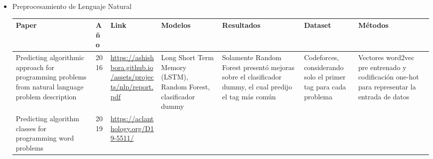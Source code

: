 \documentclass{article}
\begin{document}
\begin{itemize}
    \item Preprocesamiento de Lenguaje Natural
          
          \begin{longtable}{|p{2cm}|p{0.8cm}|p{2cm}|p{2cm}|p{3cm}|p{2cm}|p{3cm}|}
              \hline
              \textbf{Paper} & \textbf{Año}                                                                                                                                                       & \textbf{Link} & \textbf{Modelos} & \textbf{Resultados} & \textbf{Dataset} & \textbf{Métodos} \\
              \hline
              \endfirsthead
              
              \hline
              \endfoot
              
              \hline
              \endlastfoot
              
              
              Predicting algorithmic approach for programming problems from natural language problem description 
                             & 2016 
                             & \href{https://ashishbora.github.io/assets/projects/nlp/report.pdf}{\url{https://ashishbora.github.io/assets/projects/nlp/report.pdf}}

              
              
              
              
              
                             & Long Short Term Memory (LSTM), Random Forest, clasificador dummy
                             & Solamente Random Forest presentó mejoras sobre el clasificador dummy, el cual predijo el tag más común
                             & Codeforces, considerando solo el primer tag para cada problema
                             & Vectores word2vec pre entrenado y codificación one-hot para representar la entrada de datos                                                                                                                                                                             \\
              
              \hline
              Predicting algorithm classes for programming word problems
                             & 2019
                             & \href{https://aclanthology.org/D19-5511/}{\url{https://aclanthology.org/D19-5511/}}

              
              
              
              

\end{longtable}
\end{itemize}
\end{document}

